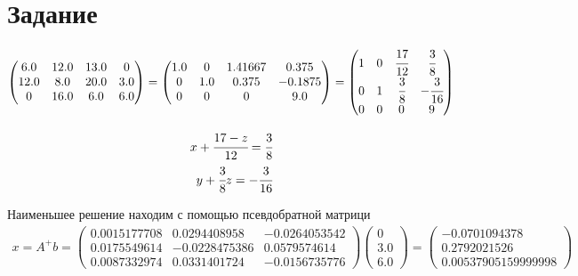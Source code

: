 \section{Задание}
\begin{gather}
    \begin{pmatrix} 
        6.0 & 12.0 & 13.0 & 0 \\ 
        12.0 & 8.0 & 20.0 & 3.0 \\ 
        0 & 16.0 & 6.0 & 6.0
    \end{pmatrix}
    =
    \begin{pmatrix}
        1.0 & 0 & 1.41667 & 0.375\\ 
        0 & 1.0 & 0.375 & -0.1875\\ 
        0 & 0 & 0 & 9.0
    \end{pmatrix}
    = 
    \begin{pmatrix} 
        1 & 0 & \cfrac{17}{12} & \cfrac{3}{8}  \\ 
        0 & 1 & \cfrac{3}{8} & -\cfrac{3}{16}\\ 
        0 & 0 & 0 & 9
    \end{pmatrix}
\end{gather}

\begin{eqnarray}
    x + \cfrac{17-z}{12}=\cfrac{3}{8}\\
    y + \cfrac{3}{8}z=-\cfrac{3}{16}
\end{eqnarray}

Наименьшее решение находим с помощью псевдобратной матрици
\begin{gather}
    x = A^+ b = 
    \begin{pmatrix}
        0.0015177708 & 0.0294408958 & -0.0264053542\\ 
        0.0175549614 & -0.0228475386 & 0.0579574614\\ 
        0.0087332974 & 0.0331401724 & -0.0156735776
    \end{pmatrix}
    \begin{pmatrix}
        0\\ 
        3.0\\ 
        6.0
    \end{pmatrix}
    =
    \begin{pmatrix}
        -0.0701094378\\ 
        0.2792021526\\ 
        0.00537905159999998
    \end{pmatrix}
\end{gather}



